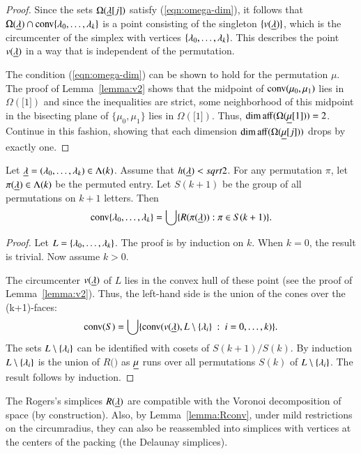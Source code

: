 \begin{proof} 
Since the sets $\Omega({\underline{\lambda}}[j])$ satisfy (\ref{eqn:omega-dim}), it follows that
$\Omega({\underline{\lambda}})\cap {\operatorname{conv}}\{\lambda_0,\ldots,\lambda_k\}$ is a point consisting of the singleton $\{v({\underline{\lambda}})\}$, which is the
circumcenter of the simplex with vertices $\{\lambda_0,\ldots,\lambda_k\}$.  This describes
the point $v({\underline{\lambda}})$ in a way that is independent of the permutation.

The condition (\ref{eqn:omega-dim}) can be shown to hold for the permutation $\mu$.
The proof of Lemma~\ref{lemma:v2} shows that the midpoint of ${\operatorname{conv}}(\mu_0,\mu_1)$
lies in $\Omega(\bm[1])$ and since the inequalities are strict, some neighborhood
of this midpoint in the bisecting plane of $\{\mu_0,\mu_1\}$ lies in $\Omega(\bm[1])$.
Thus, $\operatorname{dim\,aff}(\Omega({\underline{\mu}}[1]))=2$.  Continue in this fashion, showing that each dimension
$\operatorname{dim\,aff}(\Omega({\underline{\mu}}[j]))$ drops by exactly one.
\end{proof}

\begin{lemma}\label{lemma:Rconv} Let ${\underline{\lambda}} = (\lambda_0,\ldots,\lambda_k)\in\Lambda(k)$.  Assume that $h({\underline{\lambda}})<sqrt2$.
For any permutation $\pi$, let $\pi({\underline{\lambda}})\in\Lambda(k)$ be the permuted entry.  Let
$S(k+1)$ be the group of all permutations on $k+1$ letters.   Then
$$
{\operatorname{conv}}\{\lambda_0,\ldots,\lambda_k\} = \bigcup \{ R(\pi({\underline{\lambda}})) : \pi\in S(k+1)\}.
$$
\end{lemma}

\begin{proof} Let $L = \{\lambda_0,\ldots,\lambda_k\}$.  The proof is by induction on $k$.
When $k=0$, the result is trivial.  Now assume $k>0$.

The circumcenter $v({\underline{\lambda}})$ of $L$ lies in the convex hull of these
point (see the proof of Lemma~\ref{lemma:v2}).  Thus, the left-hand side is the union
of the cones over the (k+1)-faces:
$$
{\operatorname{conv}}(S) = \bigcup\{ {\operatorname{conv}}(v({\underline{\lambda}}),L\setminus \{\lambda_i\}\ :\  i=0,\ldots,k) \}.
$$
The sets $L\setminus \{\lambda_i\}$ can be identified with  cosets of $S(k+1) /S(k)$.
By induction $L\setminus \{\lambda_i\}$ is the union of $R(\bm)$ as ${\underline{\mu}}$ runs
over all permutations $S(k)$ of $L\setminus \{\lambda_i\}$.
The result follows by induction.
\end{proof}

The Rogers's simplices $R({\underline{\lambda}})$ are compatible with the Voronoi
decomposition of space (by construction).  Also, by Lemma~\ref{lemma:Rconv}, under
mild restrictions on the circumradius, they can also be reassembled into simplices
with vertices at the centers of the packing (the Delaunay simplices).

